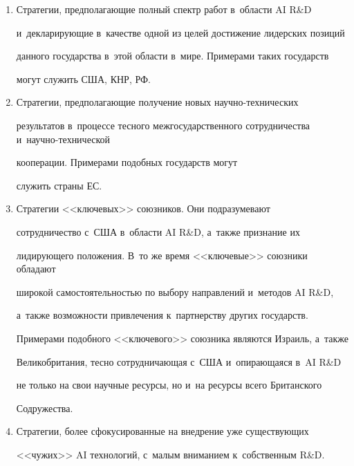 \begin{enumerate}[1.]
\begin{enumerate}[3.1]
\item Стратегии, предполагающие полный спектр работ в~области AI R\&D 


и~декларирующие в~качестве одной из целей достижение лидерских позиций 


данного государства в~этой об\-ласти в~мире. Примерами таких государств 


могут служить США, КНР, РФ.


\item  Стратегии, предполагающие получение новых на\-уч\-но-тех\-ни\-че\-ских 


результатов в~процессе тесного межгосударственного сотрудничества и~на\-уч\-но-тех\-ни\-че\-ской 


кооперации. Примерами подобных государств могут 


служить страны ЕС.


\item Стратегии <<ключевых>> союзников. Они подразумевают 


сотрудничество с~США в~области AI R\&D, а~также признание их 


лидирующего положения. В~то же время <<ключевые>> союзники обладают 


широкой самостоятельностью по выбору на\-прав\-ле\-ний и~методов AI R\&D, 


а~также воз\-мож\-ности привлечения к~партнерству других государств. 


Примерами подобного <<ключевого>> союзника являются Израиль, а~также 


Великобритания, тес\-но со\-труд\-ни\-ча\-ющая с~США и~опи\-ра\-юща\-яся в~AI R\&D 


не только на свои научные ресурсы, но и~на ресурсы всего Британского 


Содружества.


\item Стратегии, более сфокусированные на внед\-ре\-ние уже су\-ще\-ст\-ву\-ющих 


<<чужих>> AI технологий, с~малым вниманием к~собственным R\&D.


\end{enumerate}


\end{enumerate}





\vspace*{-6pt}





